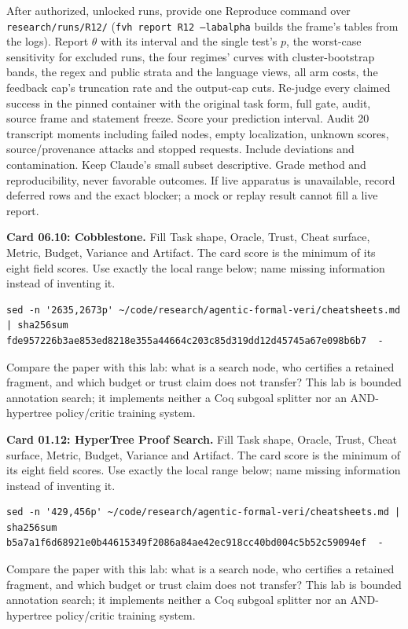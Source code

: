 \documentclass[11pt]{article}
\begin{document}
\begin{problem}\label{prob:B2}
After authorized, unlocked runs, provide one Reproduce command over
\texttt{research/runs/R12/} (\texttt{fvh report R12 --labalpha} builds the
frame's tables from the logs). Report $\theta$ with its interval and the single
test's $p$, the worst-case sensitivity for excluded runs, the four regimes'
curves with cluster-bootstrap bands, the regex and public strata and the
language views, all arm costs, the feedback cap's truncation rate and the
output-cap cuts. Re-judge every claimed success in the pinned container with
the original task form, full gate, audit, source frame and statement freeze.
Score your prediction interval. Audit 20 transcript moments including failed
nodes, empty localization, unknown scores, source/provenance attacks and
stopped requests. Include deviations and contamination. Keep Claude's small
subset descriptive. Grade method and reproducibility, never favorable outcomes.
If live apparatus is unavailable, record deferred rows and the exact blocker; a
mock or replay result cannot fill a live report.
\end{problem}
\begin{problem}\label{prob:B3}
\textbf{Card 06.10: Cobblestone.} Fill Task shape, Oracle, Trust, Cheat surface, Metric, Budget, Variance and Artifact. The card score is the minimum of its eight field scores. Use exactly the local range below; name missing information instead of inventing it.
\begin{verbatim}
sed -n '2635,2673p' ~/code/research/agentic-formal-veri/cheatsheets.md | sha256sum
fde957226b3ae853ed8218e355a44664c203c85d319dd12d45745a67e098b6b7  -
\end{verbatim}
Compare the paper with this lab: what is a search node, who certifies a retained fragment, and which budget or trust claim does not transfer? This lab is bounded annotation search; it implements neither a Coq subgoal splitter nor an AND-hypertree policy/critic training system.
\end{problem}
\begin{problem}\label{prob:B4}
\textbf{Card 01.12: HyperTree Proof Search.} Fill Task shape, Oracle, Trust, Cheat surface, Metric, Budget, Variance and Artifact. The card score is the minimum of its eight field scores. Use exactly the local range below; name missing information instead of inventing it.
\begin{verbatim}
sed -n '429,456p' ~/code/research/agentic-formal-veri/cheatsheets.md | sha256sum
b5a7a1f6d68921e0b44615349f2086a84ae42ec918cc40bd004c5b52c59094ef  -
\end{verbatim}
Compare the paper with this lab: what is a search node, who certifies a retained fragment, and which budget or trust claim does not transfer? This lab is bounded annotation search; it implements neither a Coq subgoal splitter nor an AND-hypertree policy/critic training system.
\end{problem}
\end{document}
